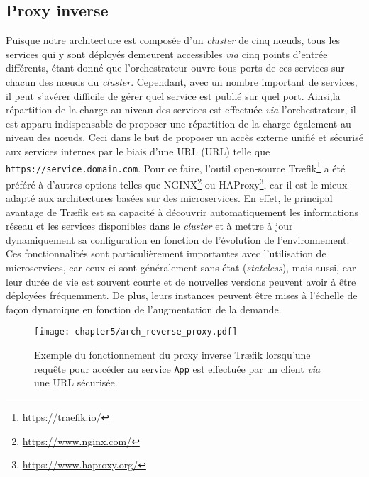 \subsection{Proxy inverse}

Puisque notre architecture est composée d'un \textit{cluster} de cinq n\oe{}uds, tous les services qui y sont déployés demeurent accessibles \textit{via} cinq points d'entrée différents, étant donné que l'orchestrateur ouvre tous ports de ces services sur chacun des n\oe{}uds du \textit{cluster}. Cependant, avec un nombre important de services, il peut s'avérer difficile de gérer quel service est publié sur quel port. Ainsi,la répartition de la charge au niveau des services est effectuée \textit{via} l'orchestrateur, il est apparu indispensable de proposer une répartition de la charge également au niveau des n\oe{}uds. Ceci dans le but de proposer un accès externe unifié et sécurisé aux services internes par le biais d'une \acs{URL} (\acl{URL}) telle que \texttt{https://service.domain.com}. Pour ce faire, l'outil open-source Tr\ae{}fik\footnote{\url{https://traefik.io/}} a été préféré à d'autres options telles que NGINX\footnote{\url{https://www.nginx.com/}} ou HAProxy\footnote{\url{https://www.haproxy.org/}}, car il est le mieux adapté aux architectures basées sur des microservices. En effet, le principal avantage de Tr\ae{}fik est sa capacité à découvrir automatiquement les informations réseau et les services disponibles dans le \textit{cluster} et à mettre à jour dynamiquement sa configuration en fonction de l'évolution de l'environnement. Ces fonctionnalités sont particulièrement importantes avec l'utilisation de  microservices, car ceux-ci sont généralement sans état (\textit{stateless}), mais aussi, car leur durée de vie est souvent courte et de nouvelles versions peuvent avoir à être déployées fréquemment. De plus, leurs instances peuvent être mises à l'échelle de façon dynamique en fonction de l'augmentation de la demande.

\begin{figure}[hb!]
	\centering
	\texttt{[image: chapter5/arch\_reverse\_proxy.pdf]}
        \caption{Exemple du fonctionnement du proxy inverse Tr\ae{}fik lorsqu'une requête pour accéder au service \texttt{App} est effectuée par un client \textit{via} une \acs{URL} sécurisée.}
	\label{fig:arch_reverse_proxy}
\end{figure}

